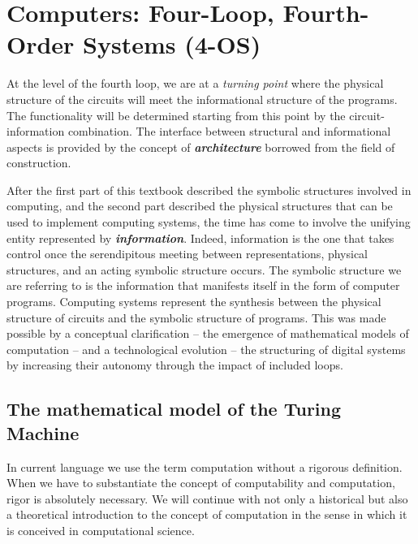 \chapter{Computers: Four-Loop, Fourth-Order Systems (4-OS)}\label{lect6}\label{ch:von_neumann_4-OS}
\localtoc


At the level of the fourth loop, we are at a {\em turning point} where the physical structure of the circuits will meet the informational structure of the programs. The functionality will be determined starting from this point by the circuit-information combination. The interface between structural and informational aspects is provided by the concept of {\bf {\em architecture}} borrowed from the field of construction.









After the first part of this textbook described the symbolic structures involved in computing, and the second part described the physical structures that can be used to implement computing systems, the time has come to involve the unifying entity represented by {\bf {\em information}}. Indeed, information is the one that takes control once the serendipitous meeting between representations, physical structures, and an acting symbolic structure occurs. The symbolic structure we are referring to is the information that manifests itself in the form of computer programs. Computing systems represent the synthesis between the physical structure of circuits and the symbolic structure of programs. This was made possible by a conceptual clarification -- the emergence of mathematical models of computation -- and a technological evolution -- the structuring of digital systems by increasing their autonomy through the impact of included loops.


\section{The mathematical model of the Turing Machine}

In current language we use the term computation without a rigorous definition. When we have to substantiate the concept of computability and computation, rigor is absolutely necessary. We will continue with not only a historical but also a theoretical introduction to the concept of computation in the sense in which it is conceived in computational science.

